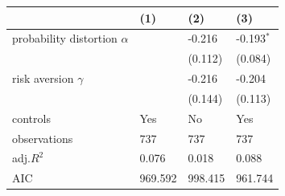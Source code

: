 \begin{tabular}{llll}
\hline
 & (1) & (2) & (3) \\
\hline
probability distortion $\alpha$ &  & -0.216 & -0.193$^{*}$ \\
 &  & (0.112) & (0.084) \\
risk aversion $\gamma$ &  & -0.216 & -0.204 \\
 &  & (0.144) & (0.113) \\
controls & Yes & No & Yes \\
observations & 737 & 737 & 737 \\
adj.$R^2$ & 0.076 & 0.018 & 0.088 \\
AIC & 969.592 & 998.415 & 961.744 \\
\hline
\end{tabular}
